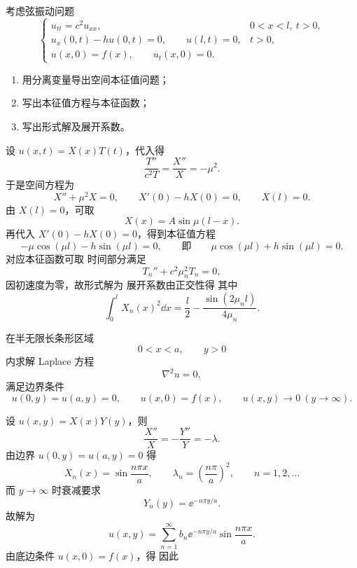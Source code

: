 ﻿


\begin{question}
考虑弦振动问题
\[
\begin{cases}
 u_{tt}=c^2u_{xx}, & 0<x<l,\ t>0,\\
 u_x(0,t)-h u(0,t)=0,\qquad u(l,t)=0, & t>0,\\
 u(x,0)=f(x),\qquad u_t(x,0)=0.
\end{cases}
\]
\begin{enumerate}[label=(\arabic*),leftmargin=2.8em,itemsep=0.2em]
\item 用分离变量导出空间本征值问题；
\item 写出本征值方程与本征函数；
\item 写出形式解及展开系数。
\end{enumerate}
\begin{solution}

设 $u(x,t)=X(x)T(t)$，代入得
\[
\frac{T''}{c^2T}=\frac{X''}{X}=-\mu^2.
\]
于是空间方程为
\[
X''+\mu^2X=0,
\qquad X'(0)-hX(0)=0,
\qquad X(l)=0.
\]
由 $X(l)=0$，可取
\[
X(x)=A\sin\mu(l-x).
\]
再代入 $X'(0)-hX(0)=0$，得到本征值方程
\[
-\mu\cos(\mu l)-h\sin(\mu l)=0,
\qquad\text{即}\qquad
\boxed{\mu\cos(\mu l)+h\sin(\mu l)=0.}
\]
对应本征函数可取
时间部分满足
\[
T_n''+c^2\mu_n^2T_n=0,
\]
因初速度为零，故形式解为
展开系数由正交性得
其中
\[
\int_0^l X_n(x)^2\dd{x}
=\frac l2-\frac{\sin(2\mu_n l)}{4\mu_n}.
\]
\end{solution}
\end{question}

\begin{question}
在半无限长条形区域
\[
0<x<a,\qquad y>0
\]
内求解 Laplace 方程
\[
\nabla^2u=0,
\]
满足边界条件
\[
u(0,y)=u(a,y)=0,\qquad u(x,0)=f(x),\qquad u(x,y)\to0\ (y\to\infty).
\]
\begin{solution}

设 $u(x,y)=X(x)Y(y)$，则
\[
\frac{X''}{X}=-\frac{Y''}{Y}=-\lambda.
\]
由边界 $u(0,y)=u(a,y)=0$ 得
\[
X_n(x)=\sin\frac{n\pi x}{a},
\qquad \lambda_n=\left(\frac{n\pi}{a}\right)^2,
\qquad n=1,2,\dots
\]
而 $y\to\infty$ 时衰减要求
\[
Y_n(y)=\ee^{-n\pi y/a}.
\]
故解为
\[
u(x,y)=\sum_{n=1}^{\infty}b_n \ee^{-n\pi y/a}\sin\frac{n\pi x}{a}.
\]
由底边条件 $u(x,0)=f(x)$，得
因此
\end{solution}
\end{question}

